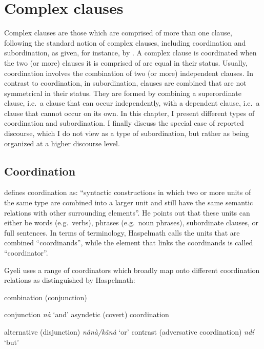 \chapter{Complex clauses}
\label{sec:CC}

Complex clauses are those which are comprised of more than one clause, following the standard notion of complex clauses, including coordination and subordination, as given, for instance, by \citet{wegener2012}. A complex clause is coordinated when the two (or more) clauses it is comprised of are equal in their status. Usually, coordination involves the combination of two (or more) independent clauses. In contrast to coordination, in subordination, clauses are combined that are not symmetrical in their status. They are formed by combining a superordinate clause, i.e.\ a clause that can occur independently, with a dependent clause, i.e.\  a clause that cannot occur on its own. In this chapter, I present different types of coordination and subordination. I finally discuss the special case of reported discourse, which I do not view as a type of subordination, but rather as being organized at a higher discourse level.


\section{Coordination}
\label{sec:Coord}

\citet[1]{haspelmath2007} defines coordination as:
``syntactic constructions in which two or more units of the same type are combined into a larger unit and still have the same semantic relations with other surrounding elements''. 
He points out that these units can either be words (e.g.\ verbs), phrases (e.g.\ noun phrases), subordinate clauses, or full sentences. In terms of terminology, Haspelmath calls the units that are combined ``coordinands'', while the element that links the coordinands is called ``coordinator''.

Gyeli uses a range of coordinators which broadly map onto different coordination relations as distinguished by Haspelmath:
\begin{enumerate}
\itshapeem combination (conjunction)
\begin{itemize}
\itshapeem conjunction {\itshape nà} `and'
\itshapeem asyndetic (covert) coordination
\end{itemize}
\itshapeem alternative (disjunction) {\itshape nânà/kânà} `or'
\itshapeem contrast (adversative coordination) {\itshape ndí} `but'
\end{enumerate}

